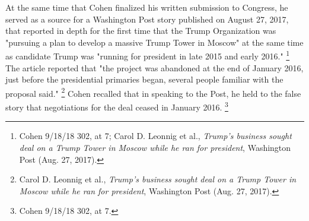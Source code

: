 {At the same time that Cohen finalized his written submission to Congress, he served as a source for a Washington Post story published on August 27, 2017, that reported in depth for the first time that the Trump Organization was "pursuing a plan to develop a massive Trump Tower in Moscow" at the same time as candidate Trump was "running for president in late 2015 and early 2016."%
\footnote{Cohen 9/18/18 302, at 7;
Carol D. Leonnig et al., \textit{Trump's business sought deal on a Trump Tower in Moscow while he ran for president}, Washington Post (Aug. 27, 2017).}
The article reported that "the project was abandoned at the end of January 2016, just before the presidential primaries began, several people familiar with the proposal said."%
\footnote{Carol D. Leonnig et al., \textit{Trump's business sought deal on a Trump Tower in Moscow while he ran for president}, Washington Post (Aug. 27, 2017).}
Cohen recalled that in speaking to the Post, he held to the false story that negotiations for the deal ceased in January 2016.%
\footnote{Cohen 9/18/18 302, at 7.}

}
